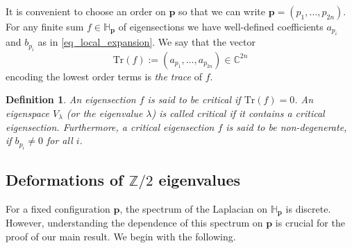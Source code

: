 \documentclass[11pt]{amsart}
\newtheorem{definition}[theorem]{Definition}
\newcommand{\C}{{\mathbb C}}
\newcommand{\Tr}{\mathrm{Tr}}
\newcommand{\ZT}{\mathbb{Z}/2}
\newcommand{\mbH}{\mathbb{H}}
\newcommand{\mbp}{\mathbf{p}}
\begin{document}
It is convenient to choose an order on $\mbp$ so that we can write $\mbp=(p_1,\ldots,p_{2n})$. 
For any finite sum $f\in\mbH_\mbp$ of eigensections we have well-defined  coefficients $a_{p_i}$ and $b_{p_i}$ as in \eqref{eq_local_expansion}.  
We say that the vector
\[
\Tr(f):=(a_{p_1},\ldots,a_{p_{2n}})\in\C^{2n}
\]
encoding the lowest order terms is \emph{the trace} of $f$.

\begin{definition}
	An eigensection $f$ is said to be \emph{critical} if $\Tr(f)=0$.  
	An eigenspace $V_{\lambda}$ (or the eigenvalue $\lambda$) is called \emph{critical} if it contains a critical eigensection.  
	Furthermore, a critical eigensection $f$ is said to be \emph{non-degenerate},  if $b_{p_i}\neq 0$ for all $i$.
\end{definition}



\subsection{Deformations of \texorpdfstring{$\ZT$}{Z/2} eigenvalues}
For a fixed configuration $\mbp$, the spectrum of the Laplacian on $\mbH_\mbp$ is discrete. However, understanding  the dependence of this spectrum on $\mbp$ is crucial for the proof of our main result. 
We begin with the following.
\end{document}
